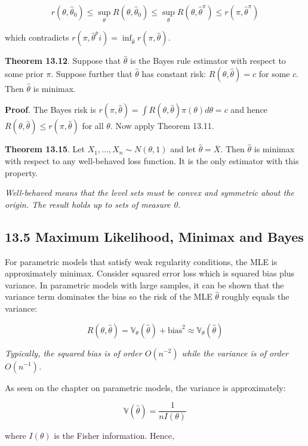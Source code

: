 \[r(\theta, \hat{\theta}_{0}) \leq \sup_\theta R(\theta, \hat{\theta}_{0}) \leq \sup_\theta R(\theta, \hat{\theta}^\pi) \leq r(\pi, \hat{\theta}^\pi)\]

which contradicts
\(r(\pi, \hat{\theta}^pi) = \inf_{\hat{\theta}} r(\pi, \hat{\theta})\).

\textbf{Theorem 13.12}. Suppose that \(\hat{\theta}\) is the Bayes rule
estimator with respect to some prior \(\pi\). Suppose further that
\(\hat{\theta}\) has constant risk: \(R(\theta, \hat{\theta}) = c\) for
some \(c\). Then \(\hat{\theta}\) is minimax.

\textbf{Proof}. The Bayes risk is
\(r(\pi, \hat{\theta}) = \int R(\theta, \hat{\theta}) \pi(\theta) d\theta = c\)
and hence \(R(\theta, \hat{\theta}) \leq r(\pi, \hat{\theta})\) for all
\(\theta\). Now apply Theorem 13.11.

\textbf{Theorem 13.15}. Let \(X_{1}, \dots, X_{n} \sim N(\theta, 1)\) and
let \(\hat{\theta} = \overline{X}\). Then \(\hat{\theta}\) is minimax
with respect to any well-behaved loss function. It is the only estimator
with this property.

\emph{Well-behaved means that the level sets must be convex and
symmetric about the origin. The result holds up to sets of measure 0.}

\subsection*{13.5 Maximum Likelihood, Minimax and
Bayes}\label{maximum-likelihood-minimax-and-bayes}

For parametric models that satisfy weak regularity conditions, the MLE
is approximately minimax. Consider squared error loss which is squared
bias plus variance. In parametric models with large samples, it can be
shown that the variance term dominates the bias so the risk of the MLE
\(\hat{\theta}\) roughly equals the variance:

\[R(\theta, \hat{\theta}) = \mathbb{V}_\theta(\hat{\theta}) + \text{bias}^{2} \approx \mathbb{V}_\theta(\hat{\theta})\]

\emph{Typically, the squared bias is of order \(O(n^{-2})\) while the
variance is of order \(O(n^{-1})\).}

As seen on the chapter on parametric models, the variance is
approximately:

\[\mathbb{V}(\hat{\theta}) = \frac{1}{nI(\theta)}\]

where \(I(\theta)\) is the Fisher information. Hence,

